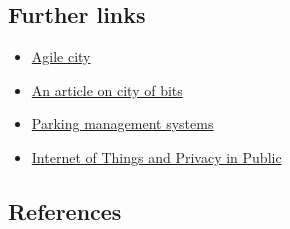 \documentclass[
]{book}
\providecommand{\tightlist}{%
  \setlength{\itemsep}{0pt}\setlength{\parskip}{0pt}}
\begin{document}
\hypertarget{further-links-4}{%
\subsection*{Further links}\label{further-links-4}}

\begin{itemize}
\tightlist
\item
  \href{https://agile-city.com/agile-city-research/digital-tools-for-participatory-led-design/}{Agile city}
\item
  \href{https://theconversation.com/surprise-digital-space-isnt-replacing-public-space-and-might-even-help-make-it-better-87173}{An article on city of bits}
\item
  \href{https://archer-soft.com/blog/how-build-real-time-parking-availability-system}{Parking management systems}
\item
  \href{https://jsis.washington.edu/news/internet-of-things-and-privacy-in-public/}{Internet of Things and Privacy in Public}
\end{itemize}

\hypertarget{references-5}{%
\subsection*{References}\label{references-5}}
\end{document}

